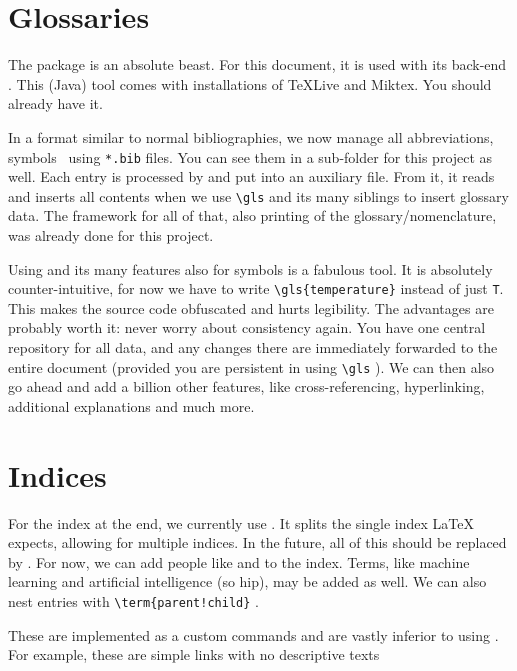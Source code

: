 \section{Glossaries}
The package  is an absolute beast.
For this document, it is used with its back-end .
This (Java) tool comes with installations of TeXLive and Miktex.
You should already have it.

In a format similar to normal bibliographies, we now manage all abbreviations, symbols \ using \texttt{*.bib} files.
You can see them in a sub-folder for this project as well.
Each entry is processed by  and put into an auxiliary file.
From it, it reads and inserts all contents when we use \verb|\gls| and its many siblings to insert glossary data.
The framework for all of that, also printing of the glossary/nomenclature, was already done for this project.

Using  and its many features also for symbols is a fabulous tool.
It is absolutely counter-intuitive, for now we have to write \verb|\gls{temperature}| instead of just \verb|T|.
This makes the source code obfuscated and hurts legibility.
The advantages are probably worth it: never worry about consistency again.
You have one central repository for all data, and any changes there are immediately forwarded to the entire document (provided you are persistent in using \verb|\gls| ).
We can then also go ahead and add a billion other features, like cross-referencing, hyperlinking, additional explanations and much more.
\section{Indices}
For the index at the end, we currently use .
It splits the single index \LaTeX{} expects, allowing for multiple indices.
In the future, all of this should be replaced by .
For now, we can add people like  and  to the index.
Terms, like machine learning  and artificial intelligence  (so hip), may be added as well.
We can also nest entries with \verb|\term{parent!child}| .

These are implemented as a custom commands and are vastly inferior to using .
For example, these are simple links with no descriptive texts 

